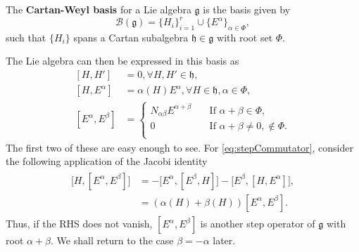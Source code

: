 \documentclass[11pt,fleqn]{article}
\begin{document}
\begin{example}
\end{example}

\begin{definition}
	The \textbf{Cartan-Weyl basis} for a Lie algebra $\mathfrak{g}$ is the basis given by
		\begin{equation}
			\mathcal{B}(\mathfrak{g}) = \{ H_i\}_{i=1}^r \cup \{ E^\alpha \}_{\alpha \in \Phi},
		\end{equation}
	such that $\{ H_i \}$ spans a Cartan subalgebra $\mathfrak{h} \in \mathfrak{g}$ with root set $\Phi$.
\end{definition}
\begin{remark}
	The Lie algebra can then be expressed in this basis as
		\begin{subequations}\begin{align}
			[H,H'] &= 0, \forall H,H' \in \mathfrak{h}, \\
			[H,E^\alpha] &= \alpha(H) E^\alpha, \forall H \in \mathfrak{h}, \alpha \in \Phi, \\
			[E^\alpha, E^\beta] &= \begin{cases}
				N_{\alpha \beta} E^{\alpha+\beta} \quad &\text{If } \alpha + \beta \in \Phi, \\
				0  &\text{If } \alpha + \beta \neq 0, \notin \Phi. \\
			\end{cases}\label{eq:stepCommutator}
		\end{align}\end{subequations}
	The first two of these are easy enough to see. For \eqref{eq:stepCommutator}, consider the following application of the Jacobi identity
		\begin{align}\label{eq:stepCommProof}
		\begin{split}
			\big[H, [E^\alpha,E^\beta] \big] 
			&= -\big[ E^\alpha, [ E^\beta, H ] \big] - \big[E^\beta, [H,E^\alpha] \big],\\
			&= (\alpha(H) + \beta(H)) [E^\alpha, E^\beta].
		\end{split}
		\end{align}
	Thus, if the RHS does not vanish, $[E^\alpha,E^\beta]$ is another step operator of $\mathfrak{g}$ with root $\alpha + \beta$. We shall return to the case $\beta = -\alpha$ later.
\end{remark}
\end{document}
